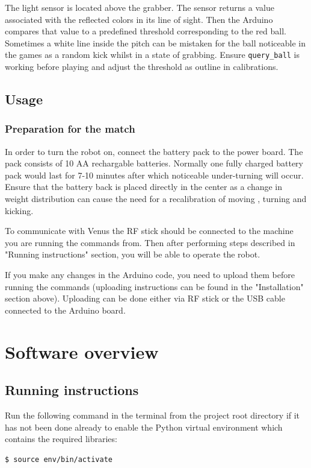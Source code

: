 \documentclass[a4paper,12pt]{article}
\begin{document}
The light sensor is located above the grabber. The sensor returns a value associated with the reflected colors in its line of sight. Then the Arduino compares that value to a predefined threshold corresponding to the red ball. Sometimes a white line inside the pitch can be mistaken for the ball noticeable in the games as a random kick whilst in a state of grabbing. Ensure \texttt{query\_ball} is working before playing and adjust the threshold as outline in calibrations.

\subsection{Usage}

\subsubsection{Preparation for the match}

In order to turn the robot on, connect the battery pack to the power board. The pack consists of 10 AA rechargable batteries. Normally one fully charged battery pack would last for 7-10 minutes after which noticeable under-turning will occur. Ensure that the battery back is placed directly in the center as a change in weight distribution can cause the need for a recalibration of moving , turning and kicking.

To communicate with Venus the RF stick should be connected to the machine you are running the commands from. Then after performing steps described in "Running instructions" section, you will be able to operate the robot.

If you make any changes in the Arduino code, you need to upload them before running the commands (uploading instructions can be found in the "Installation" section above). Uploading can be done either via RF stick or the USB cable connected to the Arduino board. 

\section{Software overview}

\subsection{Running instructions}

Run the following command in the terminal from the project root directory if it has not been done already to enable the Python virtual environment which contains the required libraries:
\begin{lstlisting}
$ source env/bin/activate
\end{lstlisting}
\end{document}

